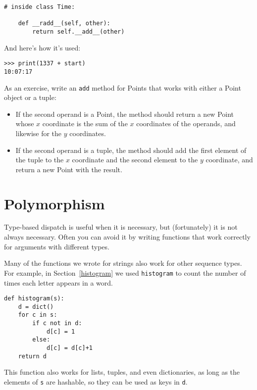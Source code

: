 \begin{lstlisting}
# inside class Time:

    def __radd__(self, other):
        return self.__add__(other)
\end{lstlisting}

%
And here's how it's used:

\begin{lstlisting}
>>> print(1337 + start)
10:07:17
\end{lstlisting}

%

As an exercise, write an {\tt add} method for Points that works with
either a Point object or a tuple:

\begin{itemize}

\item If the second operand is a Point, the method should return a new
Point whose $x$ coordinate is the sum of the $x$ coordinates of the
operands, and likewise for the $y$ coordinates.

\item If the second operand is a tuple, the method should add the
first element of the tuple to the $x$ coordinate and the second
element to the $y$ coordinate, and return a new Point with the result.

\end{itemize}




\section{Polymorphism}
\label{polymorphism}

Type-based dispatch is useful when it is necessary, but (fortunately)
it is not always necessary.  Often you can avoid it by writing functions
that work correctly for arguments with different types.

Many of the functions we wrote for strings also
work for other sequence types.
For example, in Section~\ref{histogram}
we used {\tt histogram} to count the number of times each letter
appears in a word.

\begin{lstlisting}
def histogram(s):
    d = dict()
    for c in s:
        if c not in d:
            d[c] = 1
        else:
            d[c] = d[c]+1
    return d
\end{lstlisting}
%
This function also works for lists, tuples, and even dictionaries,
as long as the elements of {\tt s} are hashable, so they can be used
as keys in {\tt d}.

